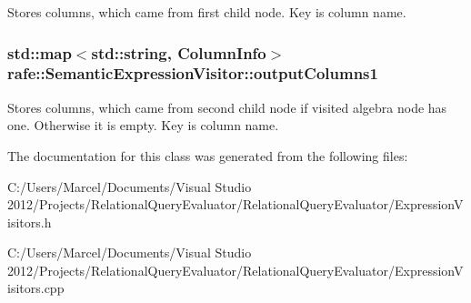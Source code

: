 Stores columns, which came from first child node. Key is column name. \hypertarget{classrafe_1_1_semantic_expression_visitor_ac36701c0aab42b76a14bfba6c5355b6c}{
\subsubsection[{output\+Columns1}]{\setlength{\rightskip}{0pt plus 5cm}std\+::map$<$std\+::string, {\bf Column\+Info}$>$ rafe\+::\+Semantic\+Expression\+Visitor\+::output\+Columns1}}\label{classrafe_1_1_semantic_expression_visitor_ac36701c0aab42b76a14bfba6c5355b6c}
Stores columns, which came from second child node if visited algebra node has one. Otherwise it is empty. Key is column name. 

The documentation for this class was generated from the following files\+:\begin{DoxyCompactItemize}
\item 
C\+:/\+Users/\+Marcel/\+Documents/\+Visual Studio 2012/\+Projects/\+Relational\+Query\+Evaluator/\+Relational\+Query\+Evaluator/Expression\+Visitors.\+h\item 
C\+:/\+Users/\+Marcel/\+Documents/\+Visual Studio 2012/\+Projects/\+Relational\+Query\+Evaluator/\+Relational\+Query\+Evaluator/Expression\+Visitors.\+cpp\end{DoxyCompactItemize}
